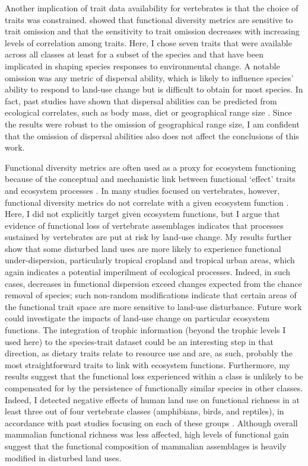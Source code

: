 Another implication of trait data availability for vertebrates is that the choice of traits was constrained. \citet{Mouillot2021} showed that functional diversity metrics are sensitive to trait omission and that the sensitivity to trait omission decreases with increasing levels of correlation among traits. Here, I chose seven traits that were available across all classes at least for a subset of the species and that have been implicated in shaping species responses to environmental change. A notable omission was any metric of dispersal ability, which is likely to influence species’ ability to respond to land-use change but is difficult to obtain for most species. In fact, past studies have shown that dispersal abilities can be predicted from ecological correlates, such as body mass, diet or geographical range size \citep{Schloss2012, Sutherland2000}. Since the results were robust to the omission of geographical range size, I am confident that the omission of dispersal abilities also does not affect the conclusions of this work.

Functional diversity metrics are often used as a proxy for ecosystem functioning because of the conceptual and mechanistic link between functional `effect' traits and ecosystem processes \citep{Lavorel2002a, Violle2007}. In many studies focused on vertebrates, however, functional diversity metrics do not correlate with a given ecosystem function \citep{Hatfield2018}. Here, I did not explicitly target given ecosystem functions, but I argue that evidence of functional loss of vertebrate assemblages indicates that processes sustained by vertebrates are put at risk by land-use change. My results further show that some disturbed land uses are more likely to experience functional under-dispersion, particularly tropical cropland and tropical urban areas, which again indicates a potential imperilment of ecological processes. Indeed, in such cases, decreases in functional dispersion exceed changes expected from the chance removal of species; such non-random modifications indicate that certain areas of the functional trait space are more sensitive to land-use disturbance. Future work could investigate the impacts of land-use change on particular ecosystem functions. The integration of trophic information (beyond the trophic levels I used here) to the species-trait dataset could be an interesting step in that direction, as dietary traits relate to resource use and are, as such, probably the most straightforward traits to link with ecosystem functions. Furthermore, my results suggest that the functional loss experienced within a class is unlikely to be compensated for by the persistence of functionally similar species in other classes. Indeed, I detected negative effects of human land use on functional richness in at least three out of four vertebrate classes (amphibians, birds, and reptiles), in accordance with past studies focusing on each of these groups \citep{Gallmetzer2015, Marcacci2021, Riemann2017, Sol2020}. Although overall mammalian functional richness was less affected, high levels of functional gain suggest that the functional composition of mammalian assemblages is heavily modified in disturbed land uses.

